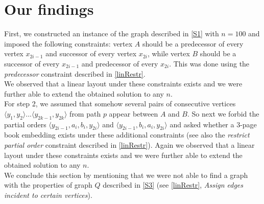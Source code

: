 \section{Our findings}
First, we constructed an instance of the graph described in \autoref{S1} with $n=100$ and imposed the following constraints: vertex $A$ should be a predecessor of every vertex $x_{2i-1}$ and successor of every vertex $x_{2i}$, while vertex $B$ should be a successor of every $x_{2i-1}$ and predecessor of every $x_{2i}$. This was done using the \textit{predecessor} constraint described in \autoref{linRestr}.\\
We observed that a linear layout under these constraints exists and we were further able to extend the obtained solution to any $n$.\\
For step 2, we assumed that somehow several pairs of consecutive vertices $\langle y_1, y_2 \rangle ... \langle y_{2k-1}, y_{2k} \rangle$ from path $p$ appear between $A$ and $B$. So next we forbid the partial orders $\langle y_{2i-1}, a_i, b_i, y_{2i} \rangle$ and $\langle y_{2i-1}, b_i, a_i, y_{2i} \rangle$ and asked whether a 3-page book embedding exists under these additional constraints (see also the \textit{restrict partial order} constraint described in \autoref{linRestr}). Again we observed that a linear layout under these constraints exists and we were further able to extend the obtained solution to any $n$.\\
We conclude this section by mentioning that we were not able to find a graph with the properties of graph $Q$ described in \autoref{S3} (see \autoref{linRestr}, \textit{Assign edges incident to certain vertices}).

